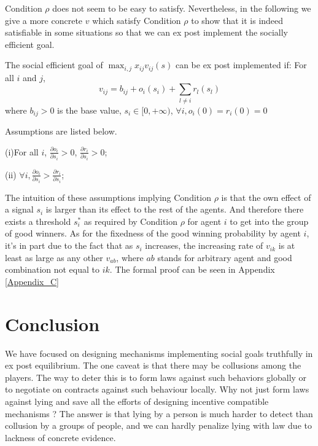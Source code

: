 Condition $\rho$ does not seem to be easy to satisfy. Nevertheless, in
the following we give a more concrete $v$ which satisfy Condition
$\rho$ to show that it is indeed satisfiable in some situations so
that we can ex post implement the socially efficient goal.
\begin{prop}
  \label{rho}
  The social efficient goal of $\max_{i,j}x_{ij}v_{ij}(s)$ can be ex post implemented if:
For all $i$ and $j$,
$$v_{ij}=b_{ij} + o_i(s_i) + \sum_{l \not = i} r_l(s_l) $$
where $b_{ij}>0$ is the base value, $s_i \in [0, + \infty)$, $\forall i,o_i(0)=r_i(0)=0$

Assumptions are listed below.

(i)For all $i$, $\frac{\partial o_i}{\partial s_i} > 0$, $\frac{\partial r_i}{\partial s_i} > 0$;

(ii) $\forall i, \frac{\partial o_i}{\partial s_i}
> \frac{\partial r_i}{\partial s_i}$;

\end{prop}


The intuition of these assumptions implying Condition $\rho$ is that
the own effect of a signal $s_i$ is larger than its effect to the rest
of the agents. And therefore there exists a threshold $s_i^*$ as
required by Condition $\rho$ for agent $i$ to get into the group of
good winners. As for the fixedness of the good winning probability by agent $i$,
it's in part due to the fact that as $s_i$ increases, the increasing
rate of $v_{ik}$ is at least as large as any other $v_{ab}$, where
$ab$ stands for arbitrary agent and good combination not equal to
$ik$. The formal proof can be seen in Appendix \ref{Appendix_C}







\section{Conclusion}

We have focused on designing mechanisms implementing social goals truthfully in ex post equilibrium. The one caveat is that there may be collusions among the players. The way to deter this is to form laws against such behaviors globally or to negotiate on contracts against such behaviour locally. Why not just form laws against lying and save all the efforts of designing incentive compatible mechanisms ? The answer is that lying by a person is much harder to detect than collusion by a groups of people, and we can hardly penalize lying with law due to lackness of concrete evidence.

